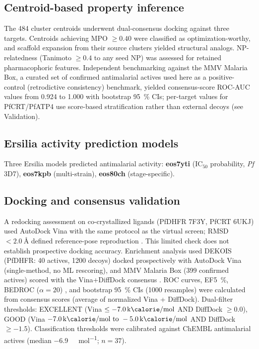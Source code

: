 \documentclass[journal=jcisd8,manuscript=article]{achemso}
\begin{document}
\subsection{Centroid-based property inference}
\label{sec:centroid_inference}

The \num{484} cluster centroids underwent dual-consensus docking against three targets. Centroids achieving MPO $\geq \num{0.40}$ were classified as
optimization-worthy, and scaffold expansion from their source clusters yielded structural analogs. NP-relatedness (Tanimoto $\geq \num{0.4}$ to any seed NP)
was assessed for retained pharmacophoric features. Independent benchmarking against the MMV Malaria Box, a curated set of confirmed antimalarial actives used
here as a positive-control (retrodictive consistency) benchmark, yielded consensus-score ROC-AUC values from \num{0.924} to \num{1.000} with bootstrap \qty{95}{\percent}
CIs; per-target values for PfCRT/PfATP4 use score-based stratification rather than external decoys (see Validation).

\subsection{Ersilia activity prediction models}

Three Ersilia models \cite{Turon2025} predicted antimalarial activity: \textbf{eos7yti} ($\text{IC}_{50}$ probability, \emph{Pf} 3D7), \textbf{eos7kpb}
(multi-strain), \textbf{eos80ch} (stage-specific).

\subsection{Docking and consensus validation}

A redocking assessment on co-crystallized ligands (PfDHFR 7F3Y, PfCRT 6UKJ) used AutoDock Vina with the same protocol as the virtual screen; RMSD $<
\qty{2.0}{\angstrom}$ defined reference-pose reproduction \cite{Eberhardt2021}. This limited check does not establish prospective docking accuracy. Enrichment analysis used DEKOIS \cite{Bauer2013} (PfDHFR: 40 actives, 1200 decoys) docked
prospectively with AutoDock Vina (single-method, no ML rescoring), and MMV Malaria Box (\num{399} confirmed actives) scored with the Vina+DiffDock consensus
\cite{Spangenberg2013}. ROC curves, EF\qty{5}{\percent}, BEDROC ($\alpha=20$) \cite{Truchon2007}, and bootstrap \qty{95}{\percent} CIs (\num{1000} resamples)
were calculated from consensus scores (average of normalized Vina + DiffDock). Dual-filter thresholds: EXCELLENT (Vina $\leq
\qty{-7.0}{\kilo\calorie\per\mole}$ AND DiffDock $\geq \num{0.0}$), GOOD (Vina $\qtyrange{-7.0}{-5.0}{\kilo\calorie\per\mole}$ AND DiffDock $\geq \num{-1.5}$).
Classification thresholds were calibrated against ChEMBL antimalarial actives (median \qty{-6.9}{\kilo\calorie\per\mole}; $n=37$).
\end{document}
